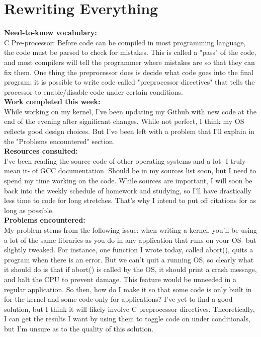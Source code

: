 \documentclass[11pt]{article}
\begin{document}
\section{Rewriting Everything}
\textbf{Need-to-know vocabulary:}\\
C Pre-processor: Before code can be compiled in most programming language, the code must be parsed to check for mistakes. This is called a "pass" of the code, and most compilers will tell the programmer where mistakes are so that they can fix them. One thing the preprocessor does is decide what code goes into the final program; it is possible to write code called "preprocessor directives" that tells the processor to enable/disable code under certain conditions. \\
\textbf{Work completed this week:}\\
While working on my kernel, I've been updating my Github with new code at the end of the evening after significant changes. While not perfect, I think my OS reflects good design choices. But I've been left with a problem that I'll explain in the "Problems encountered" section.\\
\textbf{Resources consulted:}\\
I've been reading the source code of other operating systems and a lot- I truly mean it- of GCC documentation. Should be in my sources list soon, but I need to spend my time working on the code. While sources are important, I will soon be back into the weekly schedule of homework and studying, so I'll have drastically less time to code for long stretches. That's why I intend to put off citations for as long as possible.\\
\textbf{Problems encountered:}\\
My problem stems from the following issue: when writing a kernel, you'll be using a lot of the same libraries as you do in any application that runs on your OS- but slightly tweaked. For instance, one function I wrote today, called abort(), quits a program when there is an error. But we can't quit a running OS, so clearly what it should do is that if abort() is called by the OS, it should print a crash message, and halt the CPU to prevent damage. This feature would be unneeded in a regular application. So then, how do I make it so that some code is only built in for the kernel and some code only for applications? I've yet to find a good solution, but I think it will likely involve C preprocessor directives. Theoretically, I can get the results I want by using them to toggle code on under conditionals, but I'm unsure as to the quality of this solution.\\
\end{document}
